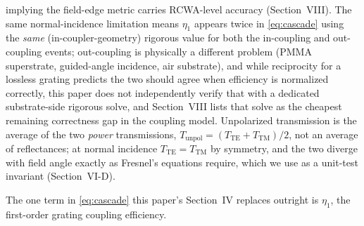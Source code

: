 \documentclass[10pt,twocolumn]{article}
\begin{document}
implying the field-edge metric carries RCWA-level accuracy (Section~VIII).
The same normal-incidence limitation means $\eta_1$ appears twice in
\eqref{eq:cascade} using the \emph{same} (in-coupler-geometry) rigorous
value for both the in-coupling and out-coupling events; out-coupling is
physically a different problem (PMMA superstrate, guided-angle incidence,
air substrate), and while reciprocity for a lossless grating predicts the
two should agree when efficiency is normalized correctly, this paper does
not independently verify that with a dedicated substrate-side rigorous
solve, and Section~VIII lists that solve as the cheapest remaining
correctness gap in the coupling model. Unpolarized transmission is the
average of the two \emph{power} transmissions, $T_{\mathrm{unpol}} =
(T_{\mathrm{TE}} + T_{\mathrm{TM}})/2$, not an average of reflectances; at
normal incidence $T_{\mathrm{TE}}=T_{\mathrm{TM}}$ by symmetry, and the two
diverge with field angle exactly as Fresnel's equations require, which we
use as a unit-test invariant (Section~VI-D).

The one term in \eqref{eq:cascade} this paper's Section~IV replaces
outright is $\eta_1$, the first-order grating coupling efficiency.
\end{document}
